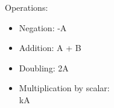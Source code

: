 Operations:
\begin{itemize}
  \item Negation: -A
  \item Addition: A + B
  \item Doubling: 2A
  \item Multiplication by scalar: \\ kA
\end{itemize}
